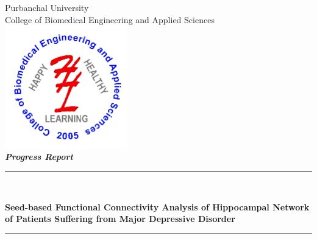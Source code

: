 \begin{titlepage}
  \selectfont
  \newcommand{\HRule}{\rule{\linewidth}{0.1mm}}

  \begin{center}

    {\huge Purbanchal University} \\[0.5cm]

    {\huge College of Biomedical Engineering and
    Applied Sciences} \\[1cm]

    \includegraphics[width=0.4\textwidth]{./.img/cbeas-logo.png} \\[1cm]

    \textbf{\Large \textit{Progress Report}} \\[0.5cm]

    \color{red}
    \HRule \\[0.4cm]
    \color{black}

    {\huge \bfseries Seed-based Functional Connectivity Analysis of
    Hippocampal Network of Patients Suffering from \linebreak Major
    Depressive Disorder}\\[-0.1cm]

    \color{red}
    \HRule \\[1.2cm]
    \color{black}


\end{center}
\end{titlepage}
